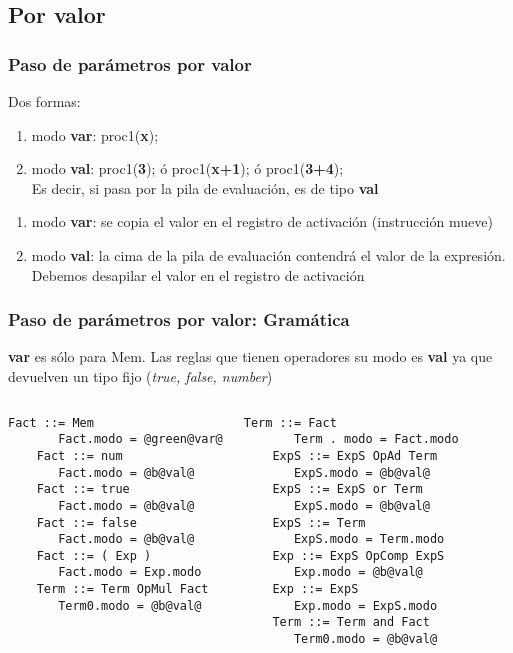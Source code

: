 \documentclass[hyperref={pdfpagelabels=false},tree-dvips,compress]{beamer}
\begin{document}
\subsection{Por valor}
\begin{frame}[fragile]
\frametitle{Paso de parámetros por valor}

Dos formas:
\begin{enumerate}[<+->]
	\item modo \textbf{var}: proc1(\textbf{x});
	\item modo \textbf{val}: proc1(\textbf{3}); ó proc1(\textbf{x+1}); ó proc1(\textbf{3+4});\\
	Es decir, si pasa por la pila de evaluación, es de tipo \textbf{val}
\end{enumerate}

\begin{enumerate}[<+->]
	\item modo \textbf{var}: se copia el valor en el registro de activación (instrucción mueve)
	\item modo \textbf{val}: la cima de la pila de evaluación contendrá el valor de la expresión. Debemos desapilar el valor en el registro de activación
\end{enumerate}

\end{frame}
\begin{frame}[fragile]
\frametitle{Paso de parámetros por valor: Gramática}

\textbf{var} es sólo para Mem. Las reglas que tienen operadores su modo es \textbf{val} ya que devuelven un tipo fijo (\emph{true, false, number})

\begin{columns}[T]
	\begin{lstlisting}[style=gramaticas,basicstyle=\footnotesize\ttfamily]
	Fact ::= Mem
	   Fact.modo = @green@var@
	Fact ::= num
	   Fact.modo = @b@val@
	Fact ::= true
	   Fact.modo = @b@val@
	Fact ::= false
	   Fact.modo = @b@val@
	Fact ::= ( Exp )
	   Fact.modo = Exp.modo
	Term ::= Term OpMul Fact
	   Term0.modo = @b@val@
	\end{lstlisting}

	\begin{lstlisting}[style=gramaticas,basicstyle=\footnotesize\ttfamily]
	Term ::= Fact
	   Term . modo = Fact.modo
	ExpS ::= ExpS OpAd Term
	   ExpS.modo = @b@val@
	ExpS ::= ExpS or Term
	   ExpS.modo = @b@val@
	ExpS ::= Term
	   ExpS.modo = Term.modo
	Exp ::= ExpS OpComp ExpS
	   Exp.modo = @b@val@
	Exp ::= ExpS
	   Exp.modo = ExpS.modo
	Term ::= Term and Fact
	   Term0.modo = @b@val@
	\end{lstlisting}

\end{columns}

\end{frame}
\end{document}
